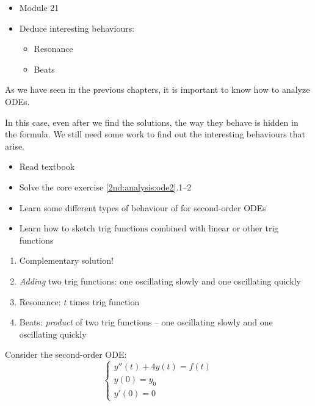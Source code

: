 \begin{lesson}

	\begin{itemize}
		\item Module 21
	\end{itemize}

	\begin{itemize}
		\item Deduce interesting behaviours:
		\begin{itemize}
			\item Resonance
			\item Beats
		\end{itemize}
	\end{itemize}
	

As we have seen in the previous chapters, it is important to know how to analyze ODEs.

In this case, even after we find the solutions, the way they behave is hidden in the formula. We still need some work to find out the interesting behaviours that arise.

\begin{itemize}
	\item Read textbook
	\item Solve the core exercise \ref{2nd:analysis:ode2}.1--2
\end{itemize}

\end{lesson}

\begin{annotation}
\begin{goals}
	\begin{itemize}
		\item Learn some different types of behaviour of for second-order ODEs
		\item Learn how to sketch trig functions combined with linear or other trig functions
	\end{itemize}
	
	\hfill
	
	\begin{enumerate}[label=.\arabic*.]
		\item Complementary solution!
		\item \emph{Adding} two trig functions: one oscillating slowly and one oscillating quickly
		\item Resonance: $t$ times trig function
		\item Beats: \emph{product} of two trig functions -- one oscillating slowly and one oscillating quickly
	\end{enumerate}
\end{goals}	
\end{annotation}
\question \label{2nd:analysis:ode2}
	Consider the second-order ODE:
	$$
	\begin{cases}
	y''(t) +4 y(t) = f(t) \\
	y(0)=y_0\\
	y'(0)=0
	\end{cases}
	$$
	
